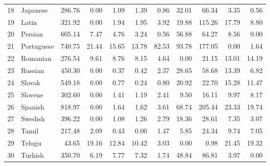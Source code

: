 \documentclass[a4paper]{article}
\begin{document}
\begin{table}
\begin{tabular}{rlrrrrrrrrr}
		18 & Japanese & 286.76 & 0.00 & 1.09 & 1.39 & 0.86 & 32.01 & 66.34 & 3.35 & 0.56 \\ 
		19 & Latin & 321.92 & 0.00 & 1.94 & 1.95 & 3.92 & 19.88 & 115.26 & 17.79 & 8.80 \\ 
		20 & Persian & 605.14 & 7.47 & 4.76 & 3.24 & 0.56 & 56.88 & 64.27 & 8.56 & 0.00 \\ 
		21 & Portuguese & 740.75 & 21.44 & 15.65 & 13.78 & 82.53 & 93.78 & 177.05 & 0.00 & 1.64 \\ 
		22 & Romanian & 276.54 & 9.61 & 8.76 & 8.15 & 4.64 & 0.00 & 21.15 & 13.01 & 14.19 \\ 
		23 & Russian & 450.30 & 0.00 & 0.37 & 0.42 & 2.37 & 28.65 & 58.68 & 13.39 & 6.82 \\ 
		24 & Slovak & 549.18 & 0.00 & 0.77 & 0.24 & 0.80 & 20.92 & 22.70 & 15.28 & 11.47 \\ 
		25 & Slovene & 302.60 & 0.00 & 1.41 & 1.19 & 2.41 & 9.50 & 16.11 & 9.97 & 8.17 \\ 
		26 & Spanish & 818.97 & 0.00 & 1.64 & 1.62 & 3.61 & 68.74 & 205.44 & 23.33 & 19.74 \\ 
		27 & Swedish & 396.22 & 0.00 & 1.08 & 1.26 & 2.79 & 18.36 & 28.61 & 7.35 & 3.07 \\ 
		28 & Tamil & 217.48 & 2.09 & 0.43 & 0.00 & 1.47 & 5.85 & 24.34 & 9.74 & 7.05 \\ 
		29 & Telugu & 43.65 & 19.16 & 12.84 & 10.42 & 3.03 & 0.00 & 0.98 & 21.45 & 19.32 \\ 
		30 & Turkish & 350.70 & 6.19 & 7.77 & 7.32 & 1.74 & 48.84 & 86.81 & 3.97 & 0.00 \\ 
		\hline
	\end{tabular}
\end{table}
\pagestyle{plain}
\end{document}
